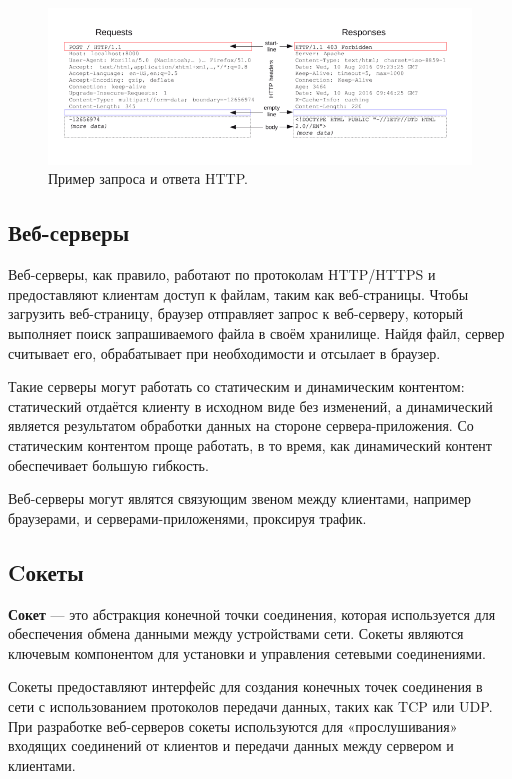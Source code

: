\begin{figure}[hbtp]
	\centering
	\includegraphics[width=\textwidth]{img/http.png}
	\caption{Пример запроса и ответа HTTP.}
	\label{fig:http_ex}
\end{figure}

\subsection{Веб-серверы}

Веб-серверы, как правило, работают по протоколам HTTP/HTTPS и
предоставляют клиентам доступ к файлам, таким как веб-страницы. Чтобы загрузить веб-страницу, браузер отправляет запрос к веб-серверу, который выполняет поиск запрашиваемого файла в своём хранилище. Найдя файл, сервер считывает его, обрабатывает при необходимости и отсылает в браузер. 

Такие серверы могут работать со статическим и динамическим контентом:
статический отдаётся клиенту в исходном виде без изменений, а динамический
является результатом обработки данных на стороне сервера-приложения. Со статическим
контентом проще работать, в то время, как динамический контент обеспечивает
большую гибкость. 

Веб-серверы могут являтся  связующим звеном между клиентами, например браузерами, и серверами-приложенями, проксируя трафик.

\subsection{Cокеты}
\textbf{Сокет} — это абстракция конечной точки соединения, которая используется для обеспечения обмена данными между устройствами сети. Сокеты являются ключевым компонентом для установки и управления сетевыми соединениями.

Сокеты предоставляют интерфейс для создания конечных точек соединения в сети с использованием протоколов передачи данных, таких как TCP или
UDP. При разработке веб-серверов сокеты используются для «прослушивания»
входящих соединений от клиентов и передачи данных между сервером и клиентами.

